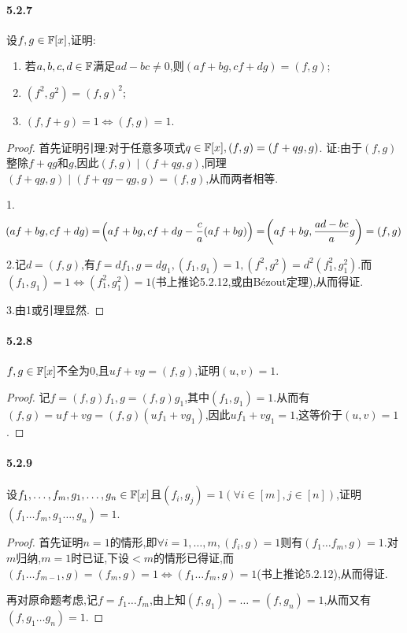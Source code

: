 \documentclass[11pt]{article}
\begin{document}
\paragraph{5.2.7}设$f,g\in\mathbb{F}[x]$,证明:
\begin{enumerate}
    \item 若$a,b,c,d\in \mathbb{F}$满足$ad-bc\neq 0$,则$(af+bg,cf+dg)=(f,g)$;
    \item $(f^2,g^2)=(f,g)^2$;
    \item $(f,f+g)=1\iff (f,g)=1$.
\end{enumerate}
\begin{proof}
    首先证明引理:对于任意多项式$q\in \mathbb{F}[x], (f,g)=(f+qg,g)$. 证:由于$(f,g)$整除$f+qg$和$g$,因此$(f,g)\mid (f+qg,g)$,同理$(f+qg,g)\mid (f+qg-qg,g)=(f,g)$,从而两者相等.

    1. 
    $$\!\left(af+bg,cf+dg\right)=\!\left(af+bg,cf+dg-\frac{c}{a}(af+bg)\right)=\!\left(af+bg,\frac{ad-bc}{a}g\right)=(f,g)$$

    2.记$d=(f,g)$,有$f=df_1, g=dg_1, (f_1,g_1)=1, (f^2,g^2)=d^2(f_1^2,g_1^2)$.而$(f_1,g_1)=1\iff (f_1^2,g_1^2)=1$(书上推论5.2.12,或由Bézout定理),从而得证.

    3.由1或引理显然.
\end{proof}
\paragraph{5.2.8}$f,g\in \mathbb{F}[x]$不全为0,且$uf+vg=(f,g)$,证明$(u,v)=1$.
\begin{proof}
    记$f=(f,g)f_1, g=(f,g)g_1$,其中$(f_1,g_1)=1$.从而有$(f,g)=uf+vg=(f,g)(uf_1+vg_1)$,因此$uf_1+vg_1=1$,这等价于$(u,v)=1$.
\end{proof}
\paragraph{5.2.9}设$f_1,\dots,f_m,g_1,\dots,g_n\in \mathbb{F}[x]$且$(f_i,g_j)=1 (\forall i\in [m], j\in [n])$,证明$(f_1\dots f_m, g_1\dots, g_n)=1$.
\begin{proof}
    首先证明$n=1$的情形,即$\forall i=1,\dots,m, (f_i,g)=1$则有$(f_1\dots f_m,g)=1$.对$m$归纳,$m=1$时已证,下设$<m$的情形已得证,而$(f_1\dots f_{m-1},g)=(f_m,g)=1\iff (f_1\dots f_m,g)=1$(书上推论5.2.12),从而得证.

    再对原命题考虑,记$f=f_1\dots f_m$,由上知$(f,g_1)=\dots=(f,g_n)=1$,从而又有$(f,g_1\dots g_n)=1$.
\end{proof}
\end{document}
